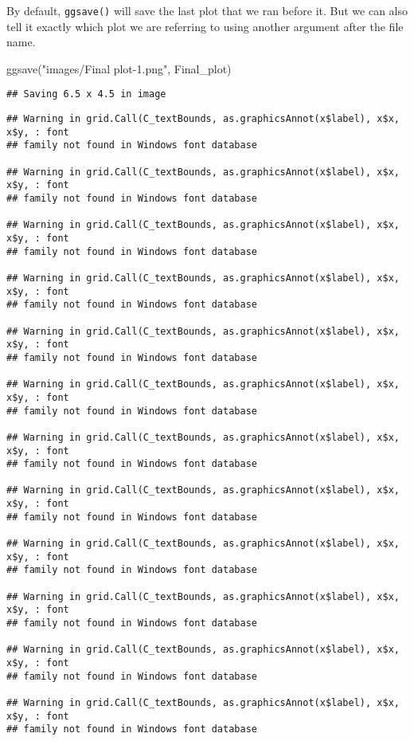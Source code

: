 \documentclass[
]{book}
\newenvironment{Shaded}{\begin{snugshade}}{\end{snugshade}}
\newcommand{\FunctionTok}[1]{\textcolor[rgb]{0.00,0.00,0.00}{#1}}
\newcommand{\NormalTok}[1]{#1}
\newcommand{\StringTok}[1]{\textcolor[rgb]{0.31,0.60,0.02}{#1}}
\begin{document}
By default, \texttt{ggsave()} will save the last plot that we ran before it. But we can also tell it exactly which plot we are referring to using another argument after the file name.

\begin{Shaded}
\begin{Highlighting}[]
\FunctionTok{ggsave}\NormalTok{(}\StringTok{"images/Final plot{-}1.png"}\NormalTok{, Final\_plot)}
\end{Highlighting}
\end{Shaded}

\begin{verbatim}
## Saving 6.5 x 4.5 in image
\end{verbatim}

\begin{verbatim}
## Warning in grid.Call(C_textBounds, as.graphicsAnnot(x$label), x$x, x$y, : font
## family not found in Windows font database

## Warning in grid.Call(C_textBounds, as.graphicsAnnot(x$label), x$x, x$y, : font
## family not found in Windows font database

## Warning in grid.Call(C_textBounds, as.graphicsAnnot(x$label), x$x, x$y, : font
## family not found in Windows font database

## Warning in grid.Call(C_textBounds, as.graphicsAnnot(x$label), x$x, x$y, : font
## family not found in Windows font database

## Warning in grid.Call(C_textBounds, as.graphicsAnnot(x$label), x$x, x$y, : font
## family not found in Windows font database

## Warning in grid.Call(C_textBounds, as.graphicsAnnot(x$label), x$x, x$y, : font
## family not found in Windows font database

## Warning in grid.Call(C_textBounds, as.graphicsAnnot(x$label), x$x, x$y, : font
## family not found in Windows font database

## Warning in grid.Call(C_textBounds, as.graphicsAnnot(x$label), x$x, x$y, : font
## family not found in Windows font database

## Warning in grid.Call(C_textBounds, as.graphicsAnnot(x$label), x$x, x$y, : font
## family not found in Windows font database

## Warning in grid.Call(C_textBounds, as.graphicsAnnot(x$label), x$x, x$y, : font
## family not found in Windows font database

## Warning in grid.Call(C_textBounds, as.graphicsAnnot(x$label), x$x, x$y, : font
## family not found in Windows font database

## Warning in grid.Call(C_textBounds, as.graphicsAnnot(x$label), x$x, x$y, : font
## family not found in Windows font database
\end{verbatim}
\end{document}
